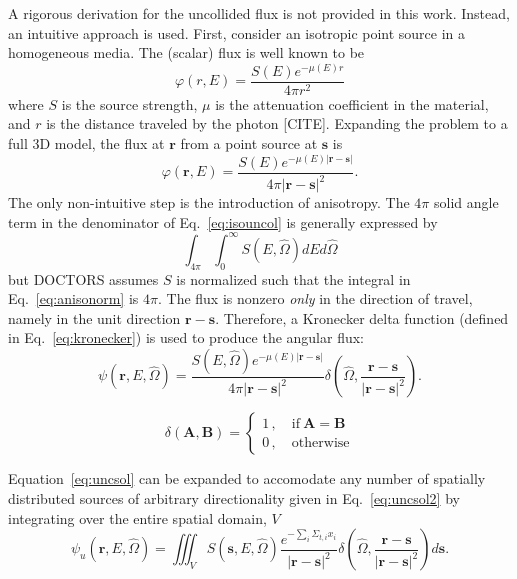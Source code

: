 A rigorous derivation for the uncollided flux is not provided in this work. Instead, an intuitive approach is used. First, consider an isotropic point source in a homogeneous media. The (scalar) flux is well known to be
\begin{equation}
\varphi(r, E) = \frac{S(E) e^{-\mu(E) r}}{4 \pi r^2}
\end{equation}
where $S$ is the source strength, $\mu$ is the attenuation coefficient in the material, and $r$ is the distance traveled by the photon [CITE]. Expanding the problem to a full 3D model, the flux at $\boldsymbol{r}$ from a point source at $\boldsymbol{s}$ is
\begin{equation}\label{eq:isouncol}
\varphi(\boldsymbol{r}, E) = \frac{S(E) e^{-\mu(E) |\boldsymbol{r}-\boldsymbol{s}|}}{4 \pi |\boldsymbol{r}-\boldsymbol{s}|^2}.
\end{equation}
The only non-intuitive step is the introduction of anisotropy. The $4 \pi$ solid angle term in the denominator of Eq.~\ref{eq:isouncol} is generally expressed by
\begin{equation}\label{eq:anisonorm}
\int_{4 \pi}^{} \int_{0}^{\infty} S(E, \hat{\Omega}) dE d\hat{\Omega}
\end{equation}
but DOCTORS assumes $S$ is normalized such that the integral in Eq.~\ref{eq:anisonorm} is $4 \pi$. The flux is nonzero \textit{only} in the direction of travel, namely in the unit direction $\boldsymbol{r} - \boldsymbol{s}$. Therefore, a Kronecker delta function (defined in Eq.~\ref{eq:kronecker}) is used to produce the angular flux:
\begin{equation}\label{eq:uncsol}
\psi(\boldsymbol{r}, E, \hat{\Omega}) = \frac{S(E, \hat{\Omega}) e^{-\mu(E) |\boldsymbol{r}-\boldsymbol{s}|}}{4 \pi |\boldsymbol{r}-\boldsymbol{s}|^2} \delta \left( \hat{\Omega}, \frac{\boldsymbol{r} - \boldsymbol{s}}{|\boldsymbol{r} - \boldsymbol{s}|^2}\right).
\end{equation}

\begin{equation} \label{eq:kronecker}
\delta(\boldsymbol{A}, \boldsymbol{B}) = 
\begin{cases}
1 \,, \quad \mathrm{if} \ \boldsymbol{A}=\boldsymbol{B} \\
0 \,, \quad \mathrm{otherwise}
\end{cases}
\end{equation}

Equation~\ref{eq:uncsol} can be expanded to accomodate any number of spatially distributed sources of arbitrary directionality given in Eq.~\ref{eq:uncsol2} by integrating over the entire spatial domain, $V$
\begin{equation} \label{eq:uncsol2}
\psi_u(\boldsymbol{r}, E, \hat{\Omega}) = \iiint_{V}
S(\boldsymbol{s}, E, \hat{\Omega})
\frac{e^{-\sum_i \Sigma_{t,i} x_i}}{|\boldsymbol{r}-\boldsymbol{s}|^2}
\delta\left( \hat{\Omega}, \frac{\boldsymbol{r}-\boldsymbol{s}}{|\boldsymbol{r}-\boldsymbol{s}|^2}\right)
d \boldsymbol{s}.
\end{equation}

